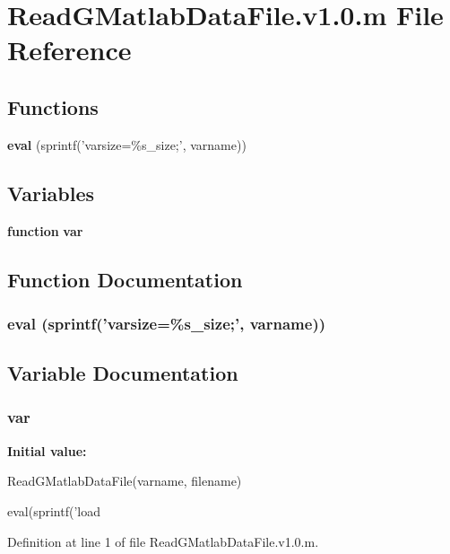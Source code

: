 \section{ReadGMatlabDataFile.v1.0.m File Reference}
\label{ReadGMatlabDataFile_8v1_80_8m}
\subsection*{Functions}
\begin{DoxyCompactItemize}
\item 
{\bf eval} (sprintf('varsize=\%s\_\-size;', varname))
\end{DoxyCompactItemize}
\subsection*{Variables}
\begin{DoxyCompactItemize}
\item 
{\bf function} {\bf var}
\end{DoxyCompactItemize}


\subsection{Function Documentation}
\subsubsection[{eval}]{\setlength{\rightskip}{0pt plus 5cm}eval (sprintf('varsize=\%s\_\-size;', varname))}\label{ReadGMatlabDataFile_8v1_80_8m_a6f217d64e43fd40c2eb04a81e57d7a1f}


\subsection{Variable Documentation}
\subsubsection[{var}]{ {\bf var}}\label{ReadGMatlabDataFile_8v1_80_8m_a4fdd13e26a831c0dff92f623df42f347}
{\bfseries Initial value:}
\begin{DoxyCode}
 ReadGMatlabDataFile(varname, filename)

eval(sprintf('load %
\end{DoxyCode}


Definition at line 1 of file ReadGMatlabDataFile.v1.0.m.